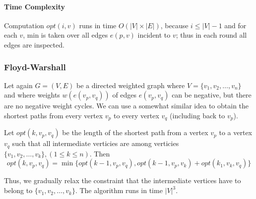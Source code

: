 \paragraph{Time Complexity}
Computation \(opt(i,v)\) runs in time \(O(|V| \times |E|)\), because \(i \leq |V| - 1\) and for each \(v\), min is taken over all edges \(e(p,v)\) incident to \(v\); thus in each round all edges are inspected.

\subsubsection{Floyd-Warshall}
Let again \(G = (V,E)\) be a directed weighted graph where \(V = \{v_1, v_2, \dots, v_n \}\) and where weights \(w(e(v_p, v_q))\) of edges \(e(v_p, v_q)\) can be negative, but there are no negative weight cycles. We can use a somewhat similar idea to obtain the shortest paths from every vertex \(v_p\) to every vertex \(v_q\) (including back to \(v_p\)).

Let \(opt(k, v_p, v_q)\) be the length of the shortest path from a vertex \(v_p\) to a vertex \(v_q\) such that all intermediate verticies are among verticies \(\{v_1, v_2, \dots, v_k\}, (1 \leq k \leq n)\). Then
\[opt(k,v_p,v_q) = \min\{opt(k-1,v_p,v_q), opt(k-1, v_p, v_k) + opt(k_1, v_k, v_q)\}\]

Thus, we gradually relax the constraint that the intermediate vertices have to belong to \(\{v_1, v_2, \dots, v_k\}\). The algorithm runs in time \(|V|^3\).

